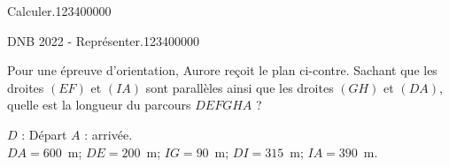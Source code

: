 \begin{pageParcoursd}
\begin{ExoCd}{Calculer.}{1234}{0}{0}{0}{0}{0}
\end{ExoCd}
 
 
 
\begin{ExoCd}{DNB 2022 - Représenter.}{1234}{0}{0}{0}{0}{0}

\begin{minipage}{0.6\linewidth}

Pour une épreuve d'orientation, Aurore reçoit
le plan ci-contre. Sachant que les droites $(EF)$ et $(IA)$ sont
parallèles ainsi que les droites $(GH)$ et $(DA)$, quelle est la
longueur du parcours $DEFGHA$ ?

\vspace{5mm}

$D$ : Départ\kern1cm $A$ : arrivée.\\
$DA=600$~m; $DE=200$~m; $IG=90$~m; $DI=315$~m; $IA=390$~m.
\end{minipage}
\begin{minipage}{0.4\linewidth}


\end{minipage}
\end{ExoCd}
\end{pageParcoursd}
